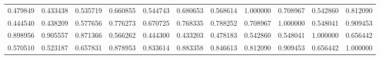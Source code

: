 \begin{table}
\begin{tabular}{lcr}
0.479849 & 0.433438 & 0.535719 & 0.660855 & 0.544743 & 0.680653 & 0.568614 & 1.000000 & 0.708967 & 0.542860 & 0.812090 \\
0.444540 & 0.438209 & 0.577656 & 0.776273 & 0.670725 & 0.768335 & 0.788252 & 0.708967 & 1.000000 & 0.548041 & 0.909453 \\
0.898956 & 0.905557 & 0.871366 & 0.566262 & 0.444300 & 0.433203 & 0.478183 & 0.542860 & 0.548041 & 1.000000 & 0.656442 \\
0.570510 & 0.523187 & 0.657831 & 0.878953 & 0.833614 & 0.883358 & 0.846613 & 0.812090 & 0.909453 & 0.656442 & 1.000000 \\
\bottomrule
\end{tabular}
\end{table}
